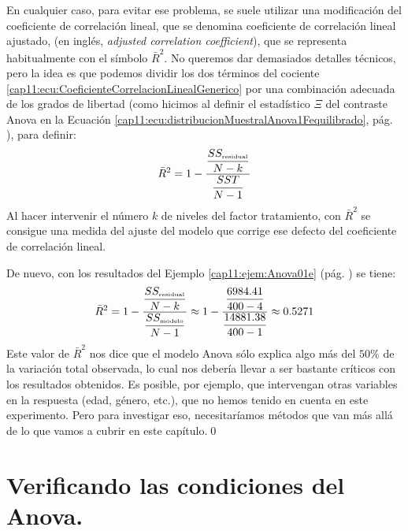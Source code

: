 En cualquier caso, para evitar ese problema, se suele utilizar una modificación del coeficiente de correlación lineal, que se denomina {\sf coeficiente de correlación lineal ajustado}, (en inglés, {\em adjusted correlation coefficient}), que se representa habitualmente con el símbolo $\bar R^2$. No queremos dar demasiados detalles técnicos, pero la idea es que podemos dividir los dos términos del cociente \ref{cap11:ecu:CoeficienteCorrelacionLinealGenerico} por una combinación adecuada de los grados de libertad (como hicimos al definir el estadístico $\Xi$ del contraste Anova en la Ecuación \ref{cap11:ecu:distribucionMuestralAnova1Fequilibrado}, pág. \pageref{cap11:ecu:distribucionMuestralAnova1Fequilibrado}), para definir:
\begin{equation}
\label{cap11:ecu:CoeficienteCorrelacionLinealAjustadoAnova}
    \bar R^2=1-\dfrac{\dfrac{SS_{\mbox{\tiny residual}}}{N-k}}{\dfrac{SST}{N-1}}
\end{equation}
Al hacer intervenir el número $k$ de niveles del factor tratamiento, con $\bar R^2$ se consigue una medida del ajuste del modelo que corrige ese defecto del coeficiente de correlación lineal.

\begin{ejemplo}
\label{cap11:ejem:CoeficienteCorrelacionAnovaFrailecillos}

De nuevo, con los resultados del Ejemplo \ref{cap11:ejem:Anova01e} (pág.
\pageref{cap11:ejem:Anova01e}) se tiene:
\[\bar R^2=1-\dfrac{\dfrac{SS_{\mbox{\tiny residual}}}{N-k}}{\dfrac{SS_{\mbox{\tiny modelo}}}{N-1}}
\approx
1-\dfrac{\dfrac{6984.41}{400-4}}{\dfrac{14881.38}{400-1}}\approx 0.5271
\]
Este valor de $\bar R^2$ nos dice que el modelo Anova sólo explica algo más del $50\%$ de la
variación total observada, lo cual nos debería llevar a ser bastante críticos con los resultados
obtenidos. Es posible, por ejemplo, que intervengan otras variables en la respuesta (edad, género,
etc.), que no hemos tenido en cuenta en este experimento. Pero para investigar eso, necesitaríamos
métodos que van más allá de lo que vamos a cubrir en este capítulo.\qed
\end{ejemplo}


\section{Verificando las condiciones del Anova.}
\label{cap11:subsec:AnalisisCondicionesAnova}

